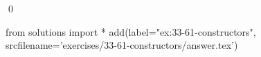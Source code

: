 
\begin{ex}
  \label{ex:33-61-constructors}
  
  \qed
\end{ex}
\begin{python0}
from solutions import *
add(label="ex:33-61-constructors",
    srcfilename='exercises/33-61-constructors/answer.tex')
\end{python0}
